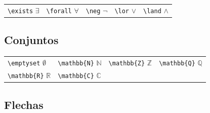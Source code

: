 \documentclass[
  a4paper,
]{scrreport}
\theoremstyle{definition}
\theoremstyle{remark}
\begin{document}
\begin{longtable}[]{@{}
  >{\raggedright\arraybackslash}p{}
  >{\raggedright\arraybackslash}p{}
  >{\raggedright\arraybackslash}p{}
  >{\raggedright\arraybackslash}p{}
  >{\raggedright\arraybackslash}p{}@{}}
\toprule\noalign{}
\endhead
\bottomrule\noalign{}
\endlastfoot
\texttt{\textbackslash{}exists} \(\exists\) &
\texttt{\textbackslash{}forall} \(\forall\) &
\texttt{\textbackslash{}neg} \(\neg\) & \texttt{\textbackslash{}lor}
\(\lor\) & \texttt{\textbackslash{}land} \(\land\) \\
\end{longtable}

\subsection{Conjuntos}\label{conjuntos}

\begin{longtable}[]{@{}
  >{\raggedright\arraybackslash}p{}
  >{\raggedright\arraybackslash}p{}
  >{\raggedright\arraybackslash}p{}
  >{\raggedright\arraybackslash}p{}@{}}
\toprule\noalign{}
\endhead
\bottomrule\noalign{}
\endlastfoot
\texttt{\textbackslash{}emptyset} \(\emptyset\) &
\texttt{\textbackslash{}mathbb\{N\}} \(\mathbb{N}\) &
\texttt{\textbackslash{}mathbb\{Z\}} \(\mathbb{Z}\) &
\texttt{\textbackslash{}mathbb\{Q\}} \(\mathbb{Q}\) \\
\texttt{\textbackslash{}mathbb\{R\}} \(\mathbb{R}\) &
\texttt{\textbackslash{}mathbb\{C\}} \(\mathbb{C}\) & & \\
\end{longtable}

\subsection{Flechas}\label{flechas}
\end{document}
